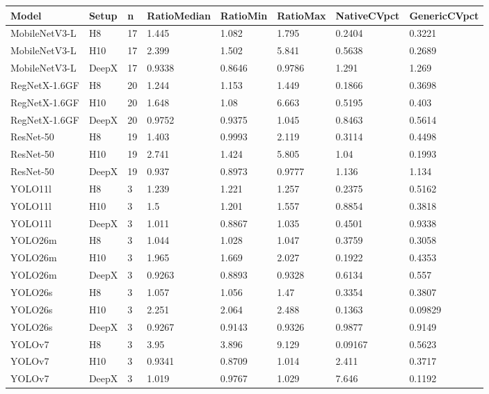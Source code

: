 \begin{tabular}{llllllll}
\hline
Model & Setup & n & RatioMedian & RatioMin & RatioMax & NativeCVpct & GenericCVpct \\
\hline
MobileNetV3-L & H8 & 17 & 1.445 & 1.082 & 1.795 & 0.2404 & 0.3221 \\
MobileNetV3-L & H10 & 17 & 2.399 & 1.502 & 5.841 & 0.5638 & 0.2689 \\
MobileNetV3-L & DeepX & 17 & 0.9338 & 0.8646 & 0.9786 & 1.291 & 1.269 \\
RegNetX-1.6GF & H8 & 20 & 1.244 & 1.153 & 1.449 & 0.1866 & 0.3698 \\
RegNetX-1.6GF & H10 & 20 & 1.648 & 1.08 & 6.663 & 0.5195 & 0.403 \\
RegNetX-1.6GF & DeepX & 20 & 0.9752 & 0.9375 & 1.045 & 0.8463 & 0.5614 \\
ResNet-50 & H8 & 19 & 1.403 & 0.9993 & 2.119 & 0.3114 & 0.4498 \\
ResNet-50 & H10 & 19 & 2.741 & 1.424 & 5.805 & 1.04 & 0.1993 \\
ResNet-50 & DeepX & 19 & 0.937 & 0.8973 & 0.9777 & 1.136 & 1.134 \\
YOLO11l & H8 & 3 & 1.239 & 1.221 & 1.257 & 0.2375 & 0.5162 \\
YOLO11l & H10 & 3 & 1.5 & 1.201 & 1.557 & 0.8854 & 0.3818 \\
YOLO11l & DeepX & 3 & 1.011 & 0.8867 & 1.035 & 0.4501 & 0.9338 \\
YOLO26m & H8 & 3 & 1.044 & 1.028 & 1.047 & 0.3759 & 0.3058 \\
YOLO26m & H10 & 3 & 1.965 & 1.669 & 2.027 & 0.1922 & 0.4353 \\
YOLO26m & DeepX & 3 & 0.9263 & 0.8893 & 0.9328 & 0.6134 & 0.557 \\
YOLO26s & H8 & 3 & 1.057 & 1.056 & 1.47 & 0.3354 & 0.3807 \\
YOLO26s & H10 & 3 & 2.251 & 2.064 & 2.488 & 0.1363 & 0.09829 \\
YOLO26s & DeepX & 3 & 0.9267 & 0.9143 & 0.9326 & 0.9877 & 0.9149 \\
YOLOv7 & H8 & 3 & 3.95 & 3.896 & 9.129 & 0.09167 & 0.5623 \\
YOLOv7 & H10 & 3 & 0.9341 & 0.8709 & 1.014 & 2.411 & 0.3717 \\
YOLOv7 & DeepX & 3 & 1.019 & 0.9767 & 1.029 & 7.646 & 0.1192 \\
\hline
\end{tabular}
